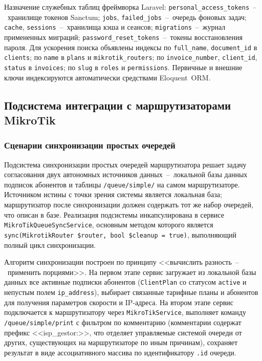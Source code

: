 Назначение служебных таблиц фреймворка Laravel: \texttt{personal\_access\_tokens}~--~хранилище токенов Sanctum; \texttt{jobs}, \texttt{failed\_jobs}~--~очередь фоновых задач; \texttt{cache}, \texttt{sessions}~--~хранилища кэша и сеансов; \texttt{migrations}~--~журнал примененных миграций; \texttt{password\_reset\_tokens}~--~токены восстановления пароля. Для ускорения поиска объявлены индексы по \texttt{full\_name}, \texttt{document\_id} в \texttt{clients}; по \texttt{name} в \texttt{plans} и \texttt{mikrotik\_routers}; по \texttt{invoice\_number}, \texttt{client\_id}, \texttt{status} в \texttt{invoices}; по \texttt{slug} в \texttt{roles} и \texttt{permissions}. Первичные и внешние ключи индексируются автоматически средствами Eloquent~ORM.

\subsection{Подсистема интеграции с маршрутизаторами MikroTik}

\subsubsection{Сценарии синхронизации простых очередей}

Подсистема синхронизации простых очередей маршрутизатора решает задачу согласования двух автономных источников данных~--~локальной базы данных подписок абонентов и таблицы \texttt{/queue/simple/} на самом маршрутизаторе. Источником истины с точки зрения системы является локальная база; маршрутизатор после синхронизации должен содержать тот же набор очередей, что описан в базе. Реализация подсистемы инкапсулирована в сервисе \texttt{MikroTikQueueSyncService}, основным методом которого является \texttt{sync(MikrotikRouter \$router, bool \$cleanup = true)}, выполняющий полный цикл синхронизации.

Алгоритм синхронизации построен по принципу <<вычислить разность~--~применить порциями>>. На первом этапе сервис загружает из локальной базы данных все активные подписки абонентов (\texttt{ClientPlan} со статусом \texttt{active} и непустым полем \texttt{ip\_address}), выбирает связанные тарифные планы и абонентов для получения параметров скорости и IP-адреса. На втором этапе сервис подключается к маршрутизатору через \texttt{MikroTikService}, выполняет команду \texttt{/queue/simple/print} с фильтром по комментарию (комментарии содержат префикс <<isp\_gestor:>>, что отделяет управляемые системой очереди от других, существующих на маршрутизаторе по иным причинам), сохраняет результат в виде ассоциативного массива по идентификатору \texttt{.id} очереди.

